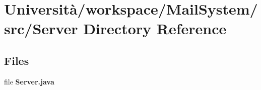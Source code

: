 \section{Università/workspace/\+Mail\+System/src/\+Server Directory Reference}
\label{dir_1f43d1a5b22d4cf8a5389f24eff2e194}
\subsection*{Files}
\begin{DoxyCompactItemize}
\item 
file \textbf{ Server.\+java}
\end{DoxyCompactItemize}
